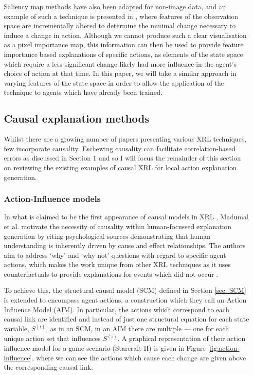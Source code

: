 \documentclass{article}
\begin{document}
Saliency map methods have also been adapted for non-image data, and an example of such a technique is presented in \cite{olson2021counterfactual}, where features of the observation space are incrementally altered to determine the minimal change necessary to induce a change in action. Although we cannot produce such a clear visualisation as a pixel importance map, this information can then be used to provide feature importance based explanations of specific actions, as elements of the state space which require a less significant change likely had more influence in the agent's choice of action at that time. In this paper, we will take a similar approach in varying features of the state space in order to allow the application of the technique to agents which have already been trained. 



\subsection{Causal explanation methods}

Whilst there are a growing number of papers presenting various XRL techniques, few incorporate causality. Eschewing causality can  facilitate correlation-based errors as discussed in Section 1 and so I will focus the remainder of this section on reviewing the existing examples of causal XRL for local action explanation generation. 


\subsubsection{Action-Influence models}

In what is claimed to be the first appearance of causal models in XRL \cite{madumal2020explainable}, Madumal et al. motivate the necessity of causality within human-focussed explanation generation by citing psychological sources demonstrating that human understanding is inherently driven by cause and effect relationships. The authors aim to address `why' and `why not' questions with regard to specific agent actions, which makes the work unique from other XRL techniques as it uses counterfactuals to provide explanations for events which did not occur \cite{puiutta2020explainable}. 

To achieve this, the structural causal model (SCM) defined in Section \ref{sec: SCM} is extended to encompass agent actions,  a construction which they call an Action Influence Model (AIM). In particular, the actions which correspond to each causal link are identified and instead of just one structural equation for each state variable, $S^{(i)}$, as in an SCM, in an AIM there are multiple — one for each unique action set that influences $S^{(i)}$. A graphical representation of their action influence model for a game scenario (Starcraft II) is given in Figure \ref{fig:action-influence}, where we can see the actions which cause each change are given above the corresponding causal link. 
\end{document}
